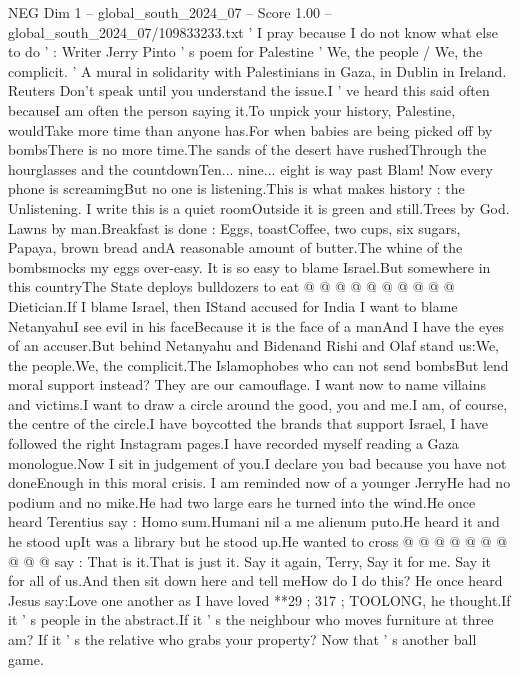 \begin{textsample}{NEG Dim 1 – global\_south\_2024\_07 – Score 1.00 – global\_south\_2024\_07/109833233.txt}  \label{ex:f1_neg_269}
' I pray because I do not know what else to do ' : Writer Jerry Pinto ' s poem for Palestine ' We, the people / We, the complicit. ' A mural in solidarity with Palestinians in Gaza, in Dublin in Ireland.
Reuters Don't speak until you understand the issue.I ' ve heard this said often becauseI am often the person saying it.To unpick your history, Palestine, wouldTake more time than anyone has.For when babies are being picked off by bombsThere is no more time.The sands of the desert have rushedThrough the hourglasses and the countdownTen... nine... eight is way past Blam!
Now every phone is screamingBut no one is listening.This is what makes history : the Unlistening.
I write this is a quiet roomOutside it is green and still.Trees by God.
Lawns by man.Breakfast is done : Eggs, toastCoffee, two cups, six sugars, Papaya, brown bread andA reasonable amount of butter.The whine of the bombsmocks my eggs over-easy.
It is so easy to blame Israel.But somewhere in this countryThe State deploys bulldozers to eat @ @ @ @ @ @ @ @ @ @ Dietician.If I blame Israel, then IStand accused for India I want to blame NetanyahuI see evil in his faceBecause it is the face of a manAnd I have the eyes of an accuser.But behind Netanyahu and Bidenand Rishi and Olaf stand us:We, the people.We, the complicit.The Islamophobes who can not send bombsBut lend moral support instead?
They are our camouflage.
I want now to name villains and victims.I want to draw a circle around the good, you and me.I am, of course, the centre of the circle.I have boycotted the brands that support Israel, I have followed the right Instagram pages.I have recorded myself reading a Gaza monologue.Now I sit in judgement of you.I declare you bad because you have not doneEnough in this moral crisis.
I am reminded now of a younger JerryHe had no podium and no mike.He had two large ears he turned into the wind.He once heard Terentius say : Homo sum.Humani nil a me alienum puto.He heard it and he stood upIt was a library but he stood up.He wanted to cross @ @ @ @ @ @ @ @ @ @ say : That is it.That is just it.
Say it again, Terry, Say it for me.
Say it for all of us.And then sit down here and tell meHow do I do this?
He once heard Jesus say:Love one another as I have loved **29 ; 317 ; TOOLONG, he thought.If it ' s people in the abstract.If it ' s the neighbour who moves furniture at three am?
If it ' s the relative who grabs your property?
Now that ' s another ball game.

\end{textsample}
